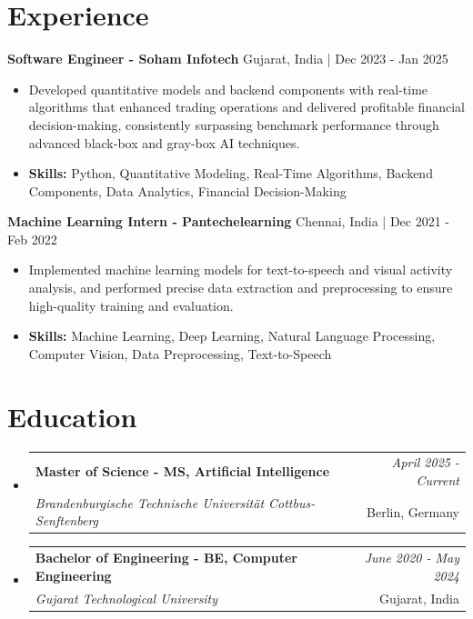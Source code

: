 \documentclass[a4paper,11pt]{article}
\makeatletter
\newcommand{\resumeSubheading}[4]{
\vspace{0.5mm}\item
    \begin{tabular*}{\linewidth}[t]{l@{\extracolsep{\fill}}r}
        \textbf{#1} & \textit{\footnotesize{#4}} \\
        \textit{\footnotesize{#3}} &  \footnotesize{#2}\\
    \end{tabular*}
    \vspace{-2.4mm}
}
\makeatother
\begin{document}
\section{\textbf{Experience}}


\vspace{1mm}
  \textbf{Software Engineer - Soham Infotech} \hfill Gujarat, India | Dec 2023 - Jan 2025
\vspace{-1.5mm} %
\begin{itemize}
  \item Developed quantitative models and backend components with real-time algorithms that enhanced trading operations and delivered profitable financial decision-making, consistently surpassing benchmark performance through advanced black-box and gray-box AI techniques.

\vspace{-2mm}
  \item \textbf{Skills:} Python, Quantitative Modeling, Real-Time Algorithms, Backend Components, Data Analytics, Financial Decision-Making
\end{itemize}

\vspace{1mm}
  \textbf{Machine Learning Intern - Pantechelearning} \hfill Chennai, India | Dec 2021 - Feb 2022
\vspace{-1.5mm} %
\begin{itemize}
  \item Implemented machine learning models for text-to-speech and visual activity analysis, and performed precise data extraction and preprocessing to ensure high-quality training and evaluation.
\vspace{-2mm}
  \item \textbf{Skills:} Machine Learning, Deep Learning, Natural Language Processing, Computer Vision, Data Preprocessing, Text-to-Speech
\end{itemize}\section{\textbf{Education}}
\vspace{-0.4mm}

\begin{itemize}[leftmargin=0.15in, label={}]
\resumeSubheading
{Master of Science - MS, Artificial Intelligence }{Berlin, Germany}
{Brandenburgische Technische Universität Cottbus-Senftenberg  }{April 2025 - Current}

\vspace{1.0mm} %
\resumeSubheading
{Bachelor of Engineering - BE, Computer Engineering  }{Gujarat, India}
{Gujarat Technological University }{June 2020 - May 2024}

\end{itemize}
\end{document}

